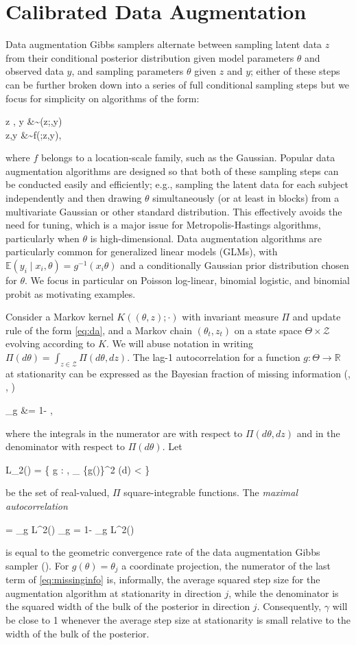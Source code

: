 \documentclass[11pt]{article}
\newcommand{\be}{\begin{equs}}
\newcommand{\ee}{\end{equs}}
\newcommand{\bb}[1]{\mathbb{#1}}
\newcommand{\mc}[1]{\mathcal{#1}}
\newcommand{\var}{\text{var}}
\begin{document}
\section{Calibrated Data Augmentation} \label{sec:cda}
Data augmentation Gibbs samplers alternate between sampling  latent data $z$ from their conditional posterior distribution given model parameters $\theta$ and observed data $y$, and sampling parameters $\theta$ given $z$ and $y$; either of these steps can be further broken down into a series of full conditional sampling steps but we focus for simplicity on algorithms of the form: 
\be \label{eq:da}
z \mid \theta, y &\sim \pi(z;\theta,y) \\
\theta \mid z,y &\sim f(\theta;z,y),
\ee
where $f$ belongs to a location-scale family, such as the Gaussian.  Popular data augmentation algorithms are designed so that both of these sampling steps can be conducted easily and efficiently; e.g., sampling the latent data for each subject independently and then drawing $\theta$ simultaneously (or at least in blocks) from a multivariate Gaussian or other standard distribution.  This effectively avoids the need for tuning, which is a major issue for Metropolis-Hastings algorithms, particularly when $\theta$ is high-dimensional.
Data augmentation algorithms are particularly common for generalized linear models (GLMs), with $\bb E(y_i \mid x_i, \theta) = g^{-1}(x_i \theta)$ and a conditionally Gaussian prior distribution chosen for $\theta$. We focus in particular on Poisson log-linear, binomial logistic, and binomial probit as motivating examples.

Consider a Markov kernel $K((\theta,z);\cdot)$ with invariant measure $\Pi$ and update rule of the form \eqref{eq:da}, and a Markov chain $(\theta_t,z_t)$ on a state space $\Theta \times \mc Z$ evolving according to $K$. We will abuse notation in writing $\Pi(d\theta) = \int_{z \in \mc Z} \Pi(d\theta,dz)$. The lag-1 autocorrelation for a function $g : \Theta \to \bb R$ at stationarity can be expressed as the Bayesian fraction of missing information (\cite{papaspiliopoulos2007general}, \cite{rubin2004multiple}, \cite{liu1994fraction})
\be
\gamma_g &= 1- \frac{\bb E[\var(g(\theta) \mid z)]}{\var(g(\theta))}, \label{eq:missinginfo}
\ee
where the integrals in the numerator are with respect to $\Pi(d\theta,dz)$ and in the denominator with respect to $\Pi(d\theta)$. Let 
\be
L_2(\Pi) = \left\{ g : \Theta \to \bb R, \int_{\theta \in \Theta} \{g(\theta)\}^2 \Pi(d\theta) < \infty \right\} 
\ee
be the set of real-valued, $\Pi$ square-integrable functions. The \emph{maximal autocorrelation}
\be
\gamma = \sup_{g \in L^2(\Pi)} \gamma_g = 1- \inf_{g \in L^2(\Pi)} \frac{\bb E[\var(g(\theta) \mid z)]}{\var(g(\theta))}
\ee
is equal to the geometric convergence rate of the data augmentation Gibbs sampler (\cite{liu1994fraction}). For $g(\theta) = \theta_j$ a coordinate projection, the numerator of the last term of \eqref{eq:missinginfo} is, informally, the average squared step size for the augmentation algorithm at stationarity in direction $j$, while the denominator is the squared width of the bulk of the posterior in direction $j$. Consequently, $\gamma$ will be close to 1 whenever the average step size at stationarity is small relative to the width of the bulk of the posterior. 
\end{document}
